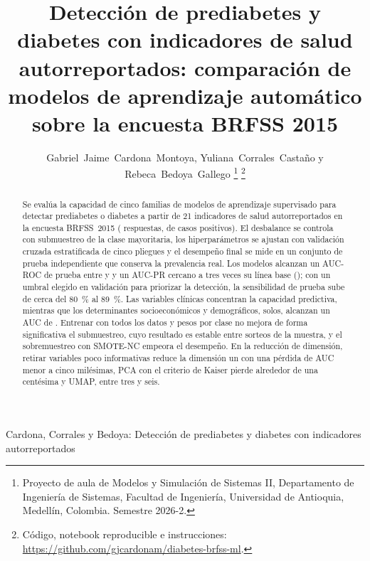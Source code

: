 \documentclass[journal]{IEEEtran}
\begin{document}

\title{Detección de prediabetes y diabetes con indicadores de salud autorreportados: comparación de modelos de aprendizaje automático sobre la encuesta BRFSS 2015}

\author{Gabriel~Jaime~Cardona~Montoya, Yuliana~Corrales~Castaño y Rebeca~Bedoya~Gallego%
\thanks{Proyecto de aula de Modelos y Simulación de Sistemas II, Departamento de Ingeniería de Sistemas, Facultad de Ingeniería, Universidad de Antioquia, Medellín, Colombia. Semestre 2026-2.}%
\thanks{Código, notebook reproducible e instrucciones: \url{https://github.com/gjcardonam/diabetes-brfss-ml}.}}

%
{Cardona, Corrales y Bedoya: Detección de prediabetes y diabetes con indicadores autorreportados}

\maketitle

\begin{abstract}
Se evalúa la capacidad de cinco familias de modelos de aprendizaje supervisado para detectar prediabetes o diabetes a partir de 21 indicadores de salud autorreportados en la encuesta BRFSS~2015 (\nRegistros{} respuestas, \prevalencia{} de casos positivos). El desbalance se controla con submuestreo de la clase mayoritaria, los hiperparámetros se ajustan con validación cruzada estratificada de cinco pliegues y el desempeño final se mide en un conjunto de prueba independiente que conserva la prevalencia real. Los modelos alcanzan un AUC-ROC de prueba entre \pruebaAucKNN{} y \pruebaAucMLP{} y un AUC-PR cercano a tres veces su línea base (\lineaBasePR); con un umbral elegido en validación para priorizar la detección, la sensibilidad de prueba sube de cerca del 80~\% al 89~\%. Las variables clínicas concentran la capacidad predictiva, mientras que los determinantes socioeconómicos y demográficos, solos, alcanzan un AUC de \bloqueRfSocialDemo. Entrenar con todos los datos y pesos por clase no mejora de forma significativa el submuestreo, cuyo resultado es estable entre sorteos de la muestra, y el sobremuestreo con SMOTE-NC empeora el desempeño. En la reducción de dimensión, retirar \nCandidatas{} variables poco informativas reduce la dimensión un \selRed{} con una pérdida de AUC menor a cinco milésimas, PCA con el criterio de Kaiser pierde alrededor de una centésima y UMAP, entre tres y seis.
\end{abstract}
\end{document}
